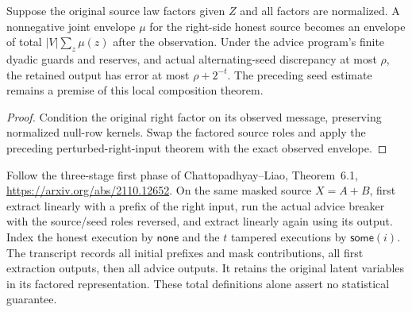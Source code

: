 \begin{theorem}
  \label{thm:lowerbounds-algebraic-alternating-advice}
  \leanok
  Suppose the original source law factors given $Z$ and all factors
  are normalized. A nonnegative joint envelope $\mu$ for the
  right-side honest source becomes an envelope of total
  $|V|\sum_z\mu(z)$ after the observation. Under the advice program's
  finite dyadic guards and reserves, and actual alternating-seed
  discrepancy at most $\rho$, the retained output has error at most
  $\rho+2^{-t}$. The preceding seed estimate remains a premise of
  this local composition theorem.
\end{theorem}
\begin{proof}
  \leanok
  Condition the original right factor on its observed message,
  preserving normalized null-row kernels. Swap the factored source
  roles and apply the preceding perturbed-right-input theorem with
  the exact observed envelope.
\end{proof}

\begin{definition}
  \label{def:lowerbounds-algebraic-affine-phase-one}
  \leanok
  Follow the three-stage first phase of Chattopadhyay--Liao,
  Theorem~6.1, \url{https://arxiv.org/abs/2110.12652}.
  On the same masked source $X=A+B$, first extract linearly with a
  prefix of the right input, run the actual advice breaker with the
  source/seed roles reversed, and extract linearly again using its output.
  Index the honest execution by $\mathsf{none}$ and the $t$ tampered
  executions by $\mathsf{some}(i)$.
  The transcript records all initial prefixes and mask contributions,
  all first extraction outputs, then all advice outputs. It retains
  the original latent variables in its factored representation.
  These total definitions alone assert no statistical guarantee.
\end{definition}


